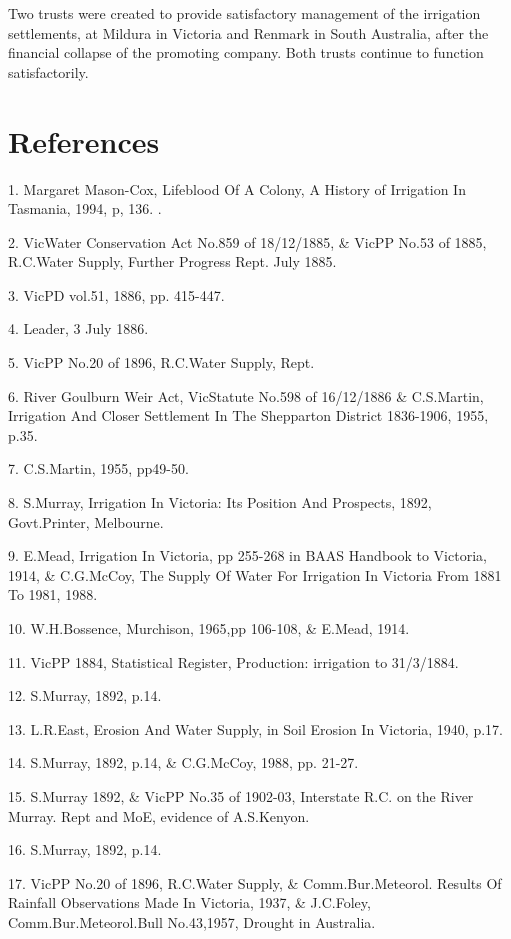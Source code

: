 Two trusts were created to provide satisfactory management of the
irrigation settlements, at Mildura in Victoria and Renmark in South
Australia, after the financial collapse of the promoting company. Both
trusts continue to function satisfactorily.

\section{References}

1. Margaret Mason-Cox, Lifeblood Of A Colony, A History of Irrigation In 
    Tasmania, 1994, p, 136.			.

2. VicWater Conservation Act No.859 of 18/12/1885, \& VicPP No.53
    of 1885, R.C.Water Supply, Further Progress Rept. July 1885.

3. VicPD vol.51, 1886, pp. 415-447.

4. Leader, 3 July 1886.

5. VicPP No.20 of 1896, R.C.Water Supply, Rept.

6. River Goulburn Weir Act, VicStatute No.598 of 16/12/1886 \& 
    C.S.Martin, Irrigation And Closer Settlement In The Shepparton District
    1836-1906, 1955, p.35.

7. C.S.Martin, 1955, pp49-50.

8. S.Murray, Irrigation In Victoria: Its Position And Prospects, 1892,
     Govt.Printer, Melbourne.

9. E.Mead, Irrigation In Victoria, pp 255-268 in BAAS Handbook to
    Victoria, 1914, \& C.G.McCoy, The Supply Of Water For Irrigation In
    Victoria From 1881 To 1981, 1988.

10. W.H.Bossence, Murchison, 1965,pp 106-108, \& E.Mead, 1914.

11. VicPP 1884, Statistical Register, Production: irrigation to 31/3/1884.

12. S.Murray, 1892, p.14.

13. L.R.East, Erosion And Water Supply, in Soil Erosion In Victoria, 1940,
      p.17.

14. S.Murray, 1892, p.14, \& C.G.McCoy, 1988, pp. 21-27. 

15. S.Murray 1892, \& VicPP No.35 of 1902-03, Interstate R.C. on the River
      Murray. Rept and MoE, evidence of A.S.Kenyon.

16. S.Murray, 1892, p.14.

17. VicPP No.20 of 1896, R.C.Water Supply, \& Comm.Bur.Meteorol.
      Results Of Rainfall Observations Made In Victoria, 1937, \& J.C.Foley,
     Comm.Bur.Meteorol.Bull No.43,1957, Drought in Australia. 

